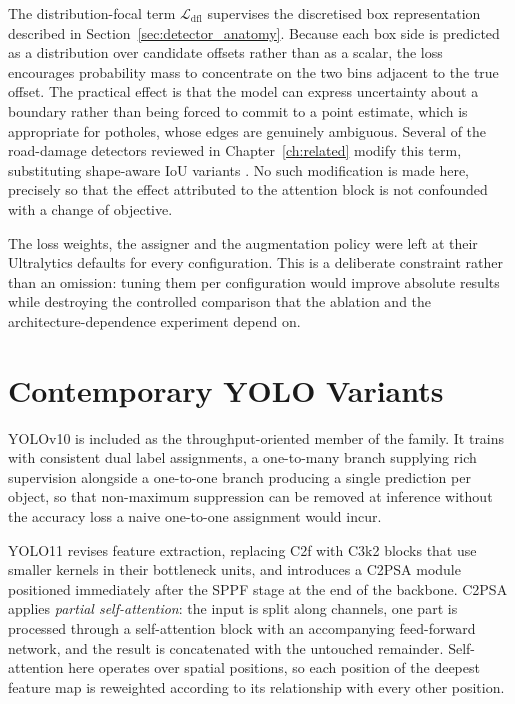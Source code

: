 \documentclass[MScCS]{uccthesis}
\begin{document}
The distribution-focal term $\mathcal{L}_{\mathrm{dfl}}$ supervises the
discretised box representation described in
Section~\ref{sec:detector_anatomy}. Because each box side is predicted as a
distribution over candidate offsets rather than as a scalar, the loss
encourages probability mass to concentrate on the two bins adjacent to the true
offset. The practical effect is that the model can express uncertainty about a
boundary rather than being forced to commit to a point estimate, which is
appropriate for potholes, whose edges are genuinely ambiguous. Several of the
road-damage detectors reviewed in Chapter~\ref{ch:related} modify this term,
substituting shape-aware IoU variants \parencite{lu2025fmsyolo,gao2025glbdetr}.
No such modification is made here, precisely so that the effect attributed to
the attention block is not confounded with a change of objective.

The loss weights, the assigner and the augmentation policy were left at their
Ultralytics defaults for every configuration. This is a deliberate constraint
rather than an omission: tuning them per configuration would improve absolute
results while destroying the controlled comparison that the ablation and the
architecture-dependence experiment depend on.

\section{Contemporary YOLO Variants}
\label{sec:yolo_variants}

YOLOv10 \parencite{wang2024yolov10} is included as the throughput-oriented
member of the family. It trains with consistent dual label assignments, a
one-to-many branch supplying rich supervision alongside a one-to-one branch
producing a single prediction per object, so that non-maximum suppression can
be removed at inference without the accuracy loss a naive one-to-one assignment
would incur.

YOLO11 \parencite{ultralytics2024yolov11} revises feature extraction, replacing
C2f with C3k2 blocks that use smaller kernels in their bottleneck units, and
introduces a C2PSA module positioned immediately after the SPPF stage at the
end of the backbone. C2PSA applies \emph{partial self-attention}: the input is
split along channels, one part is processed through a self-attention block with
an accompanying feed-forward network, and the result is concatenated with the
untouched remainder. Self-attention here operates over spatial positions, so
each position of the deepest feature map is reweighted according to its
relationship with every other position.
\end{document}
